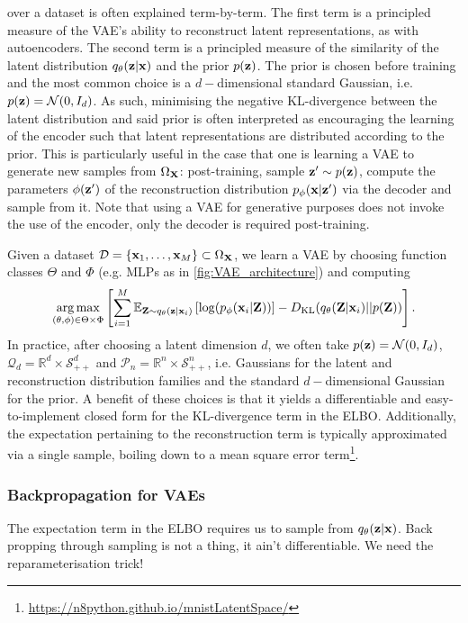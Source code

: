 \documentclass[11pt]{article}
\begin{document}
over a dataset is often explained term-by-term. The first term is a principled measure of the VAE's ability to reconstruct latent representations, as with autoencoders. The second term is a principled measure of the similarity of the latent distribution $q_{\theta}(\mathbf{z}|\mathbf{x})$ and the prior $p(\mathbf{z})$. The prior is chosen before training and the most common choice is a $d-$dimensional standard Gaussian, i.e. $p(\mathbf{z})=\mathcal{N}(0,I_d)$. As such, minimising the negative KL-divergence between the latent distribution and said prior is often interpreted as encouraging the learning of the encoder such that latent representations are distributed according to the prior. This is particularly useful in the case that one is learning a VAE to generate new samples from $\Omega_{\mathbf{X}}$: post-training, sample $\mathbf{z}'\sim p(\mathbf{z})$, compute the parameters $\phi(\mathbf{z}')$ of the reconstruction distribution $p_{\phi}(\mathbf{x}|\mathbf{z}')$ via the decoder and sample from it. Note that using a VAE for generative purposes does not invoke the use of the encoder, only the decoder is required post-training.

Given a dataset $\mathcal{D}=\{\mathbf{x}_1,\dots,\mathbf{x}_M\}\subset\Omega_{\mathbf{X}}$, we learn a VAE by choosing function classes $\Theta$ and $\Phi$ (e.g. MLPs as in \autoref{fig:VAE_architecture}) and computing
$$
\operatorname*{arg\,max}_{(\theta,\phi)\in\Theta\times\Phi}
\left[
\sum_{i=1}^M
\mathbb{E}_{\mathbf{Z}\sim q_{\theta}(\mathbf{z}|\mathbf{x}_i)}\left[\log(p_{\phi}(\mathbf{x}_i|\mathbf{Z}))\right]-D_{\text{KL}}(q_{\theta}(\mathbf{Z}|\mathbf{x}_i)||p(\mathbf{Z}))
\right].
$$
In practice, after choosing a latent dimension $d$, we often take $p(\mathbf{z})=\mathcal{N}(0,I_d)$, $\mathcal{Q}_d=\mathbb{R}^d\times\mathcal{S}_{++}^d$ and $\mathcal{P}_n=\mathbb{R}^n\times\mathcal{S}_{++}^n$, i.e. Gaussians for the latent and reconstruction distribution families and the standard $d-$dimensional Gaussian for the prior. A benefit of these choices is that it yields a differentiable and easy-to-implement closed form for the KL-divergence term in the ELBO. Additionally, the expectation pertaining to the reconstruction term is typically approximated via a single sample, boiling down to a mean square error term\footnote{\url{https://n8python.github.io/mnistLatentSpace/}}.

\subsubsection{Backpropagation for VAEs}
\TODO{} The expectation term in the ELBO requires us to sample from $q_{\theta}(\mathbf{z}|\mathbf{x})$. Back propping through sampling is not a thing, it ain't differentiable. We need the reparameterisation trick!
\end{document}
